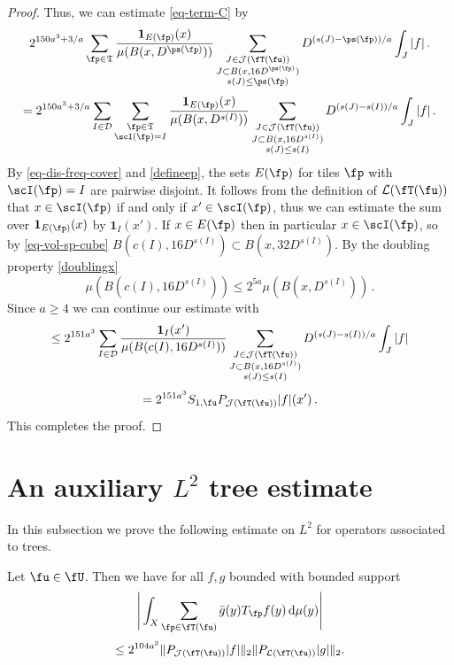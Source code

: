 \begin{proof}
    Thus, we can estimate \eqref{eq-term-C} by
    $$
        2^{150a^3 + 3/a}\sum_{\fp\in \mathfrak{T}}\frac{\mathbf{1}_{E(\fp)}(x)}{\mu(B(x,D^{\ps(\fp)}))}\sum_{\substack{J\in \mathcal{J}(\fT(\fu))\\J\subset B(x, 16D^{\ps(\fp)})\\ s(J) \le \ps(\fp)}} D^{(s(J) - \ps(\fp))/a} \int_J |f|\,.
    $$
    $$
        = 2^{150a^3 + 3/a}\sum_{I \in \mathcal{D}} \sum_{\substack{\fp\in \mathfrak{T}\\ \scI(\fp) = I}}\frac{\mathbf{1}_{E(\fp)}(x)}{\mu(B(x, D^{s(I)}))}\sum_{\substack{J\in \mathcal{J}(\fT(\fu))\\J\subset B(x, 16 D^{s(I)})\\ s(J) \le s(I)}} D^{(s(J) - s(I))/a} \int_J |f|\,.
    $$
    By \eqref{eq-dis-freq-cover} and \eqref{defineep}, the sets $E(\fp)$ for tiles $\fp$ with $\scI(\fp) = I$ are pairwise disjoint. It follows from the definition of $\mathcal{L}(\fT(\fu))$ that $x \in \scI(\fp)$ if and only if $x' \in \scI(\fp)$, thus we can estimate the sum over $\mathbf{1}_{E(\fp)}(x)$ by $\mathbf{1}_{I}(x')$.
    If $x \in E(\fp)$ then in particular $x \in \scI(\fp)$, so by \eqref{eq-vol-sp-cube} $B(c(I),16D^{s(I)}) \subset B(x, 32D^{s(I)})$. By the doubling property \eqref{doublingx}
    $$
        \mu(B(c(I), 16D^{s(I)})) \le 2^{5a} \mu(B(x, D^{s(I)}))\,.
    $$
    Since $a \ge 4$ we can continue our estimate with
    $$
        \le 2^{151a^3}\sum_{I \in \mathcal{D}} \frac{\mathbf{1}_{I}(x')}{\mu(B(c(I), 16D^{s(I)}))}\sum_{\substack{J\in \mathcal{J}(\fT(\fu))\\J\subset B(x, 16 D^{s(I)})\\ s(J) \le s(I)}} D^{(s(J) - s(I))/a} \int_J |f|
    $$
    $$
         = 2^{151a^3} S_{1,\fu} P_{\mathcal{J}(\fT(\fu))}|f|(x')\,.
    $$
    This completes the proof.
\end{proof}

\section{An auxiliary \texorpdfstring{$L^2$}{L2} tree estimate}

In this subsection we prove the following estimate on $L^2$ for operators associated to trees.

\begin{lemma}
    \label{tree-projection-estimate}
    \leanok
    Let $\fu \in \fU$.
    Then we have for all $f, g$ bounded with bounded support
    $$
        \Bigg|\int_X \sum_{\fp \in \fT(\fu)} \bar g(y) T_{\fp}f(y) \, \mathrm{d}\mu(y) \Bigg|
    $$
    \begin{equation}
        \label{eq-tree-est}
         \le 2^{104a^3}\|P_{\mathcal{J}(\fT(\fu))}|f|\|_{2}\|P_{\mathcal{L}(\fT(\fu))}|g|\|_{2}.
    \end{equation}
\end{lemma}


